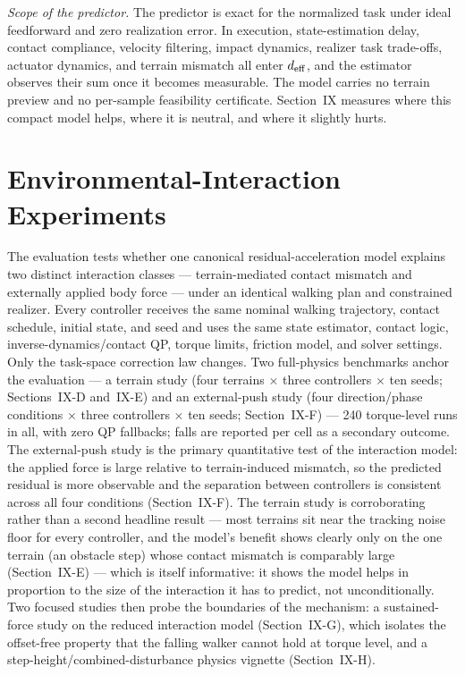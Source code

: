 \documentclass[journal]{IEEEtran}
\theoremstyle{plain}
\theoremstyle{definition}
\theoremstyle{remark}
\newcommand{\deff}{d_{\rm eff}}
\begin{document}
\emph{Scope of the predictor.} The predictor is exact for the normalized task under ideal feedforward and zero realization error. In execution, state-estimation delay, contact compliance, velocity filtering, impact dynamics, realizer task trade-offs, actuator dynamics, and terrain mismatch all enter $\deff$, and the estimator observes their sum once it becomes measurable. The model carries no terrain preview and no per-sample feasibility certificate. Section~IX measures where this compact model helps, where it is neutral, and where it slightly hurts.

\section{Environmental-Interaction Experiments}\label{sec:experiments}

The evaluation tests whether one canonical residual-acceleration model explains two distinct interaction classes --- terrain-mediated contact mismatch and externally applied body force --- under an identical walking plan and constrained realizer. Every controller receives the same nominal walking trajectory, contact schedule, initial state, and seed and uses the same state estimator, contact logic, inverse-dynamics/contact QP, torque limits, friction model, and solver settings. Only the task-space correction law changes. Two full-physics benchmarks anchor the evaluation --- a terrain study (four terrains $\times$ three controllers $\times$ ten seeds; Sections~IX-D and~IX-E) and an external-push study (four direction/phase conditions $\times$ three controllers $\times$ ten seeds; Section~IX-F) --- 240 torque-level runs in all, with zero QP fallbacks; falls are reported per cell as a secondary outcome. The external-push study is the primary quantitative test of the interaction model: the applied force is large relative to terrain-induced mismatch, so the predicted residual is more observable and the separation between controllers is consistent across all four conditions (Section~IX-F). The terrain study is corroborating rather than a second headline result --- most terrains sit near the tracking noise floor for every controller, and the model's benefit shows clearly only on the one terrain (an obstacle step) whose contact mismatch is comparably large (Section~IX-E) --- which is itself informative: it shows the model helps in proportion to the size of the interaction it has to predict, not unconditionally. Two focused studies then probe the boundaries of the mechanism: a sustained-force study on the reduced interaction model (Section~IX-G), which isolates the offset-free property that the falling walker cannot hold at torque level, and a step-height/combined-disturbance physics vignette (Section~IX-H).
\end{document}
